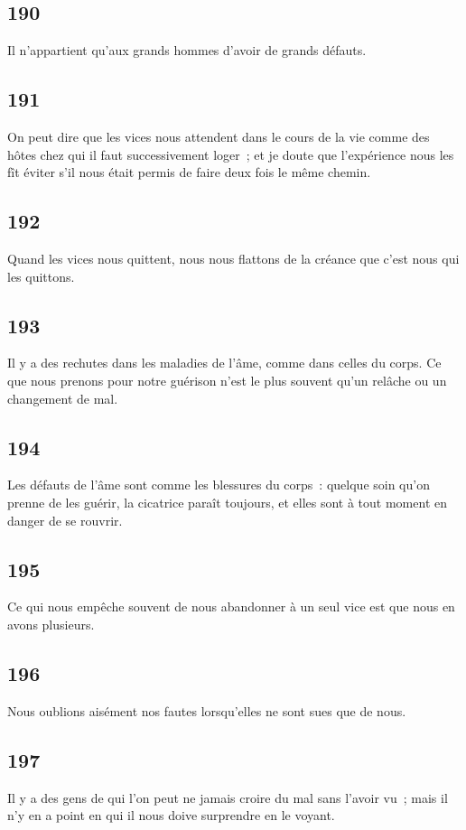 \documentclass[french,twoside]{book} %
\begin{document}
\subsection[{190}]{ \textsc{190} }
\noindent Il n’appartient qu’aux grands hommes d’avoir de grands défauts.
\subsection[{191}]{ \textsc{191} }
\noindent On peut dire que les vices nous attendent dans le cours de la vie comme des hôtes chez qui il faut successivement loger ; et je doute que l’expérience nous les fît éviter s’il nous était permis de faire deux fois le même chemin.
\subsection[{192}]{ \textsc{192} }
\noindent Quand les vices nous quittent, nous nous flattons de la créance que c’est nous qui les quittons.
\subsection[{193}]{ \textsc{193} }
\noindent Il y a des rechutes dans les maladies de l’âme, comme dans celles du corps. Ce que nous prenons pour notre guérison n’est le plus souvent qu’un relâche ou un changement de mal.
\subsection[{194}]{ \textsc{194} }
\noindent Les défauts de l’âme sont comme les blessures du corps : quelque soin qu’on prenne de les guérir, la cicatrice paraît toujours, et elles sont à tout moment en danger de se rouvrir.
\subsection[{195}]{ \textsc{195} }
\noindent Ce qui nous empêche souvent de nous abandonner à un seul vice est que nous en avons plusieurs.
\subsection[{196}]{ \textsc{196} }
\noindent Nous oublions aisément nos fautes lorsqu’elles ne sont sues que de nous.
\subsection[{197}]{ \textsc{197} }
\noindent Il y a des gens de qui l’on peut ne jamais croire du mal sans l’avoir vu ; mais il n’y en a point en qui il nous doive surprendre en le voyant.
\end{document}
